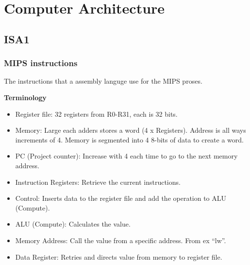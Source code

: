 \chapter{Computer Architecture}

\newpage


\section{ISA1}
\subsection{MIPS instructions}
The instructions that a assembly languge use for the MIPS proses.

\noindent\textbf{Terminology} \newline
\begin{itemize}
\item  Register file: 32 registers from R0-R31, each is 32 bits.
\item  Memory: Large each adders stores a word (4 x Registers). Address is all ways increments of 4.
       Memory is segmented into 4 8-bits of data to create a word.
\item  PC (Project counter): Increase with 4 each time to go to the next memory address.
\item  Instruction Registers: Retrieve the current instructions.
\item  Control: Inserts data to the register file and add the operation to ALU (Compute).
\item  ALU (Compute): Calculates the value.
\item  Memory Address: Call the value from a specific address. From ex ``lw''.
\item  Data Register: Retries and directs value from memory to register file.
\end{itemize}

